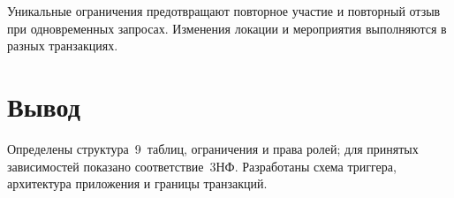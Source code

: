 Уникальные ограничения предотвращают повторное участие и повторный отзыв при одновременных запросах. Изменения локации и мероприятия выполняются в разных транзакциях.

\section{Вывод}

Определены структура~9~таблиц, ограничения и права ролей; для принятых зависимостей показано соответствие~3НФ. Разработаны схема триггера, архитектура приложения и границы транзакций.
